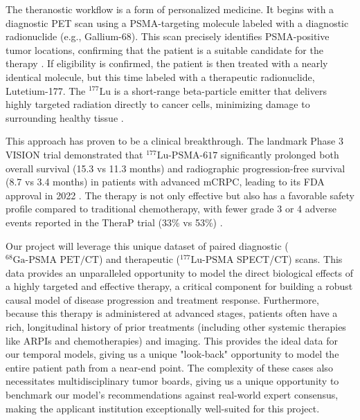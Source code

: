 \documentclass[11pt, a4paper]{article}
\begin{document}
The theranostic workflow is a form of personalized medicine. It begins with a diagnostic PET scan using a PSMA-targeting molecule labeled with a diagnostic radionuclide (e.g., Gallium-68). This scan precisely identifies PSMA-positive tumor locations, confirming that the patient is a suitable candidate for the therapy \cite{HennrichEder2022, KaewputVinjamuri2022}. If eligibility is confirmed, the patient is then treated with a nearly identical molecule, but this time labeled with a therapeutic radionuclide, Lutetium-177. The ${}^{177}\text{Lu}$ is a short-range beta-particle emitter that delivers highly targeted radiation directly to cancer cells, minimizing damage to surrounding healthy tissue \cite{HennrichEder2022, SadaghianiSheikhbahaei2022}.

This approach has proven to be a clinical breakthrough. The landmark Phase 3 VISION trial demonstrated that ${}^{177}\text{Lu-PSMA-617}$ significantly prolonged both overall survival (15.3 vs 11.3 months) and radiographic progression-free survival (8.7 vs 3.4 months) in patients with advanced mCRPC, leading to its FDA approval in 2022 \cite{TschanBorgna2022, ChandranFigg2022, RamnaraignSartor2023, JangKendi2023}. The therapy is not only effective but also has a favorable safety profile compared to traditional chemotherapy, with fewer grade 3 or 4 adverse events reported in the TheraP trial (33\% vs 53\%) \cite{HofmanEmmett2024, PatellKurian2023}.

Our project will leverage this unique dataset of paired diagnostic ($^{\text{68}}\text{Ga-PSMA PET/CT}$) and therapeutic ($^{\text{177}}\text{Lu-PSMA}$ SPECT/CT) scans. This data provides an unparalleled opportunity to model the direct biological effects of a highly targeted and effective therapy, a critical component for building a robust causal model of disease progression and treatment response. Furthermore, because this therapy is administered at advanced stages, patients often have a rich, longitudinal history of prior treatments (including other systemic therapies like ARPIs and chemotherapies) and imaging. This provides the ideal data for our temporal models, giving us a unique "look-back" opportunity to model the entire patient path from a near-end point. The complexity of these cases also necessitates multidisciplinary tumor boards, giving us a unique opportunity to benchmark our model's recommendations against real-world expert consensus, making the applicant institution exceptionally well-suited for this project.
\end{document}
